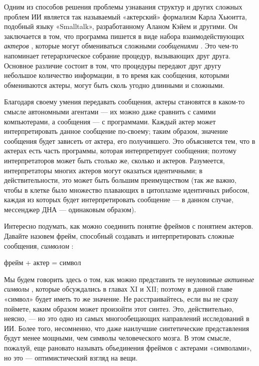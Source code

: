 \documentclass[../main.tex]{subfiles}
\begin{document}
Одним из способов решения проблемы узнавания структур и других сложных проблем ИИ является так называемый «актерский» формализм Карла Хьюитта, подобный языку «Smalltalk», разработанному Аланом Кэйем и другими. Он заключается в том, что программа пишется в виде набора взаимодействующих \emph{актеров} , которые могут обмениваться сложными \emph{сообщениями} . Это чем-то напоминает гетерархическое собрание процедур, вызывающих друг друга. Основное различие состоит в том, что процедуры передают друг другу небольшое количество информации, в то время как сообщения, которыми обмениваются актеры, могут быть сколь угодно длинными и сложными.

Благодаря своему умения передавать сообщения, актеры становятся в каком-то смысле автономными агентами --- их можно даже сравнить с самими компьютерами, а сообщения --- с программами. Каждый актер может интерпретировать данное сообщение по-своему; таким образом, значение сообщения будет зависеть от актера, его получившего. Это объясняется тем, что в актерах есть часть программы, которая интерпретирует сообщения; поэтому интерпретаторов может быть столько же, сколько и актеров. Разумеется, интерпретаторы многих актеров могут оказаться идентичными; в действительности, это может быть большим преимуществом (так же важно, чтобы в клетке было множество плавающих в цитоплазме идентичных рибосом, каждая из которых будет интерпретировать сообщение --- в данном случае, мессенджер ДНА --- одинаковым образом).

Интересно подумать, как можно соединить понятие фреймов с понятием актеров. Давайте назовем фрейм, способный создавать и интерпретировать сложные сообщения, \emph{символом} :

фрейм + актер = символ

Мы будем говорить здесь о том, как можно представить те неуловимые \emph{активные символы} , которые обсуждались в главах XI и XII; поэтому в данной главе «символ» будет иметь то же значение. Не расстраивайтесь, если вы не сразу поймете, каким образом может произойти этот синтез. Это, действительно, неясно, --- но это одно из самых многообещающих направлений исследований в ИИ\@. Более того, несомненно, что даже наилучшие синтетические представления будут менее мощными, чем символы человеческого мозга. В этом смысле, пожалуй, еще рановато называть объединения фреймов с актерами «символами», но это --- оптимистический взгляд на вещи.
\end{document}
